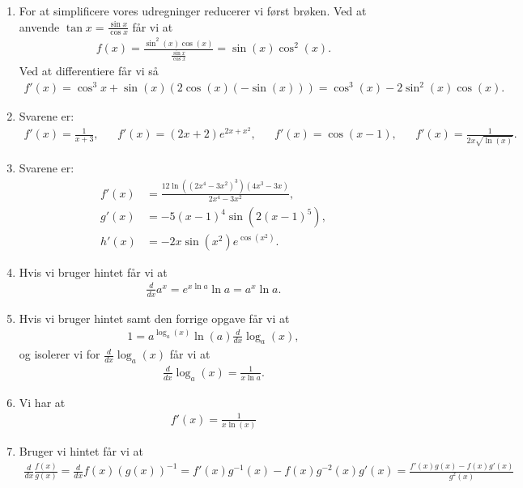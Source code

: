 \begin{enumerate}
	\item For at simplificere vores udregninger reducerer vi først brøken. Ved at anvende $\tan x=\frac{\sin x}{\cos x}$ får vi at
	\begin{align*}
	f(x)=\frac{\sin^2(x)\cos(x)}{\frac{\sin x}{\cos x}}=\sin(x)\cos^2(x).
	\end{align*}
	Ved at differentiere får vi så
	\begin{align*}
	f'(x)=\cos^3x+\sin(x)(2\cos(x)(-\sin(x)))=\cos^3(x)-2\sin^2(x)\cos(x).
	\end{align*}
	
	\item Svarene er:
	\begin{align*}
	f'(x)=\frac{1}{x+3},&& f'(x)=(2x+2)e^{2x+x^2},&& f'(x)=\cos(x-1),&&f'(x)=\frac{1}{2x\sqrt{\ln(x)}}.
	\end{align*}
	

	
	\item Svarene er:
	\begin{align*}
	f'(x)&=\frac{12\ln((2x^4-3x^2)^3)(4x^3-3x)}{2x^4-3x^2},\\
	g'(x)&=-5(x-1)^4\sin(2(x-1)^5),\\
	h'(x)&=-2x\sin(x^2)e^{\cos(x^2)}.
	\end{align*}
	
	\item \label{it:diff31} Hvis vi bruger hintet får vi at
	\begin{align*}
	\frac{d}{dx} a^x= e^{x\ln a} \ln a=a^x\ln a.
	\end{align*}

	\item Hvis vi bruger hintet samt den forrige opgave får vi at
	\begin{align*}
	1=a^{\log_a(x)}\ln(a) \frac{d}{dx}\log_a(x),
	\end{align*}
	og isolerer vi for $\frac{d}{dx} \log_a(x)$ får vi at
	\begin{align*}
	\frac{d}{dx} \log_a(x)=\frac{1}{x\ln a}.
	\end{align*}
	
	\item Vi har at
	\begin{align*}
	f'(x)=\frac{1}{x\ln(x)}
	\end{align*}
	
	\item Bruger vi hintet får vi at
	\begin{align*}
	\frac{d}{dx}\frac{f(x)}{g(x)}=\frac{d}{dx}f(x)(g(x))^{-1}=f'(x)g^{-1}(x)-f(x)g^{-2}(x)g'(x)=\frac{f'(x)g(x)-f(x)g'(x)}{g^2(x)}
	\end{align*}
	

\end{enumerate}
